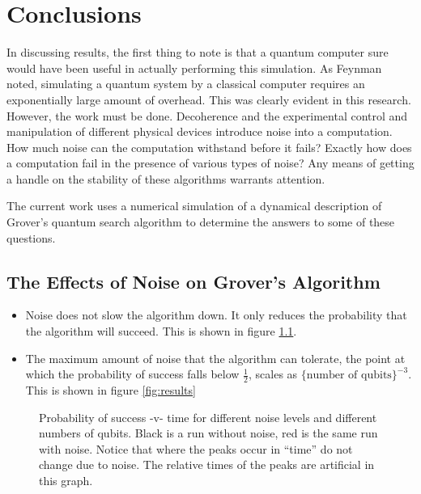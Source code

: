 
\chapter{Conclusions}
\label{chap:conclusion}
%


In discussing results, the first thing to note is that
a quantum computer sure would have been useful in actually
performing this simulation.
As Feynman noted\cite{Feynman:82}, simulating a quantum system
by a classical computer requires an exponentially large amount
of overhead.  This was clearly evident in this research.
However, the work must be done.  Decoherence and the 
experimental control and manipulation of different 
physical devices introduce noise into a computation.  
How much noise can the computation withstand before
it fails?  Exactly how does a computation fail in the
presence of various types of noise?
Any means of getting a handle
on the stability of these algorithms warrants attention.

The current work uses a numerical simulation of
a dynamical description of Grover's quantum search
algorithm to determine the answers to some of these
questions.

\section{The Effects of Noise on Grover's Algorithm}

\begin{itemize}
\item Noise does not slow the algorithm down.  It only reduces the
probability that the algorithm will succeed.  This is shown in 
figure \ref{fig:humps}.
\item The maximum amount of noise that the algorithm can tolerate,
the point at which the probability of success falls below $\frac{1}{2}$,
scales as $\lbrace\text{number of qubits}\rbrace^{-3}$.  This is shown in
figure \ref{fig:results}
\end{itemize}

\begin{figure}[h]
\begin{center}
\end{center}
\caption{Probability of success -v- time for different noise levels and different numbers
of qubits.  Black is a run without noise, red is the same run with noise.  Notice that
where the peaks occur in ``time'' do not change due to noise.  The relative times of the
peaks are artificial in this graph.}
\label{fig:humps}
\end{figure}

